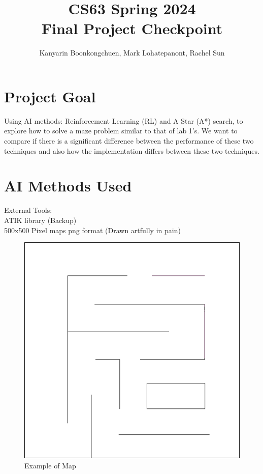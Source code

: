 \documentclass[11pt]{article}
\title{CS63 Spring 2024\\Final Project Checkpoint}
\author{Kanyarin Boonkongchuen, Mark Lohatepanont, Rachel Sun}
\date{}
\begin{document}
\maketitle

\section{Project Goal}


Using AI methods: Reinforcement Learning (RL) and A Star (A*) search, to explore how to solve a maze problem similar to that of lab 1's. 
We want to compare if there is a significant difference between the performance of these two techniques and also how the implementation differs between these two techniques.

\section{AI Methods Used}


External Tools:\\
\indent ATIK library (Backup)\\
 500x500 Pixel maps png format (Drawn artfully in pain)\\

\begin{figure}
  \centering
  \includegraphics[totalheight=8cm]{Maps/Maze1.png}
      \caption{Example of Map}
  \centering
\end{figure}
\end{document}
